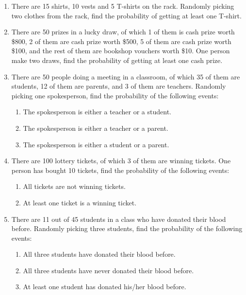 \documentclass{report}
\begin{document}
\begin{multicols}{2}
\begin{enumerate}
    \item There are 15 shirts, 10 vests and 5 T-shirts on the rack. Randomly picking two
          clothes from the rack, find the probability of getting at least one T-shirt.

    \item There are 50 prizes in a lucky draw, of which 1 of them is cash prize worth
          \$800, 2 of them are cash prize worth \$500, 5 of them are cash prize worth
          \$100, and the rest of them are bookshop vouchers worth \$10. One person make
          two draws, find the probability of getting at least one cash prize.

    \item There are 50 people doing a meeting in a classroom, of which 35 of them are
          students, 12 of them are parents, and 3 of them are teachers. Randomly picking
          one spokesperson, find the probability of the following events:
          \begin{enumerate}
            \item The spokesperson is either a teacher or a student.
            \item The spokesperson is either a teacher or a parent.
            \item The spokesperson is either a student or a parent.
          \end{enumerate}

    \item There are 100 lottery tickets, of which 3 of them are winning tickets. One
          person has bought 10 tickets, find the probability of the following events:
          \begin{enumerate}
            \item All tickets are not winning tickets.
            \item At least one ticket is a winning ticket.
          \end{enumerate}

    \item There are 11 out of 45 students in a class who have donated their blood before.
          Randomly picking three students, find the probability of the following events:
          \begin{enumerate}
            \item All three students have donated their blood before.
            \item All three students have never donated their blood before.
            \item At least one student has donated his/her blood before.
          \end{enumerate}


\end{enumerate}
\end{multicols}
\end{document}
